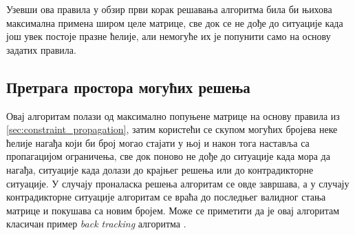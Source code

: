 Узевши ова правила у обзир први корак решавања алгоритма била би њихова максимална примена широм целе матрице, све док се не дође до ситуације када још увек постоје празне ћелије, али немогуће их је попунити само на основу задатих правила.

\subsection{Претрага простора могућих решења}

Овај алгоритам полази од максимално попуњене матрице на основу правила из \ref{sec:constraint_propagation}, затим користећи се скупом могућих бројева неке ћелије нагађа који би број могао стајати у њој и након тога наставља са пропагацијом ограничења, све док поново не дође до ситуације када мора да нагађа, ситуације када долази до крајњег решења или до контрадикторне ситуације. У случају проналаска решења алгоритам се овде завршава, а у случају контрадикторне ситуације алгоритам се враћа до последњег валидног стања матрице и покушава са новим бројем. Може се приметити да је овај алгоритам класичан пример \textit{back tracking} алгоритма \cite{backtrack}.\\